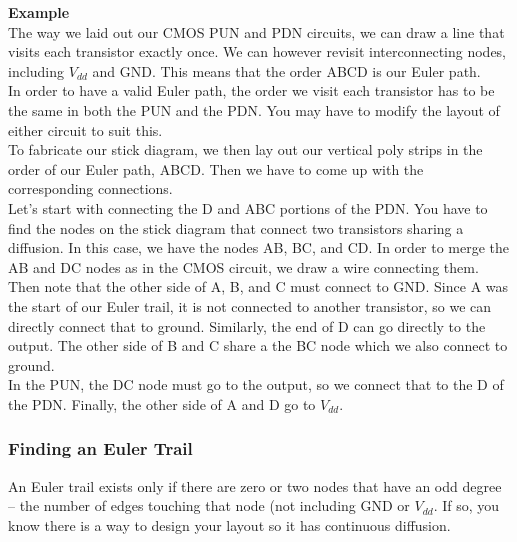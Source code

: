 \documentclass{article}
\begin{document}
\begin{minipage}{0.5\textwidth}
\textbf{Example} \\

The way we laid out our CMOS PUN and PDN circuits, we can draw a line that visits each transistor exactly once. We can however revisit interconnecting nodes, including $V_{dd}$ and GND. This means that the order ABCD is our Euler path.
\\

In order to have a valid Euler path, the order we visit each transistor has to be the same in both the PUN and the PDN. You may have to modify the layout of either circuit to suit this. 
\\

To fabricate our stick diagram, we then lay out our vertical poly strips in the order of our Euler path, ABCD. Then we have to come up with the corresponding connections. 
\\

Let's start with connecting the D and ABC portions of the PDN. You have to find the nodes on the stick diagram that connect two transistors sharing a diffusion. In this case, we have the nodes AB, BC, and CD. In order to merge the AB and DC nodes as in the CMOS circuit, we draw a wire connecting them. 
\\

Then note that the other side of A, B, and C must connect to GND. Since A was the start of our Euler trail, it is not connected to another transistor, so we can directly connect that to ground. Similarly, the end of D can go directly to the output. The other side of B and C share a the BC node which we also connect to ground.
\\

In the PUN, the DC node must go to the output, so we connect that to the D of the PDN. Finally, the other side of A and D go to $V_{dd}$.


\end{minipage}
\newpage

\subsubsection{Finding an Euler Trail}

An Euler trail exists only if there are zero or two nodes that have an odd degree -- the number of edges touching that node (not including GND or $V_{dd}$. If so, you know there is a way to design your layout so it has continuous diffusion.
\end{document}
